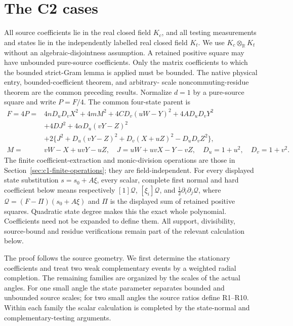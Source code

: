 \chapter{The C2 cases}
\label{ch:c2-short}
All source coefficients lie in the real closed field $K_c$, and all
testing measurements and states lie in the independently labelled real
closed field $K_t$. We use $K_c\otimes_{\mathbb R}K_t$ without an
algebraic-disjointness assumption. A retained positive square may have
unbounded pure-source coefficients. Only the matrix coefficients to
which the bounded strict-Gram lemma is applied must be bounded.
The native physical entry, bounded-coefficient theorem, and arbitrary-
scale noncommuting-residue theorem are the common preceding results.
Normalize $d=1$ by a pure-source square and write $P=F/4$. The common
four-state parent is
\begin{equation}
\begin{split}
F=4P={}&4nD_uD_vX^2+4mM^2+4CD_v(uW-Y)^2+4AD_uD_vY^2\\
&+4DJ^2+4\alpha D_u(vY-Z)^2\\
&+2\{J^2+D_u(vY-Z)^2+D_v(X+uZ)^2-D_uD_vZ^2\},\\
M={}&vW-X+uvY-uZ,\quad J=uW+uvX-Y-vZ,\quad
D_u=1+u^2,\quad D_v=1+v^2.
\end{split}\label{eq:c2-master-parent}
\end{equation}
The finite coefficient-extraction and monic-division operations are
those in Section~\ref{sec:c1-finite-operations}; they are field-independent.
For every displayed state substitution $s=s_0+A\xi$, every scalar,
complete first normal and hard coefficient below means respectively
$[1]\mathcal Q$, $[\xi_i]\mathcal Q$, and
$\frac12\partial_i\partial_j\mathcal Q$, where
$\mathcal Q=(F-\Pi)(s_0+A\xi)$ and $\Pi$ is the displayed sum of retained
positive squares. Quadratic state degree makes this the exact whole
polynomial. Coefficients need not be expanded to define them. All
support, divisibility, source-bound and residue verifications remain
part of the relevant calculation below.

The proof follows the source geometry. We first determine the stationary
coefficients and treat two weak complementary events by a weighted radial
completion. The remaining families are organized by the scales of the actual
angles. For one small angle the state parameter separates bounded and
unbounded source scales; for two small angles the source ratios define
R1--R10. Within each family the scalar calculation is completed by the
state-normal and complementary-testing arguments.

